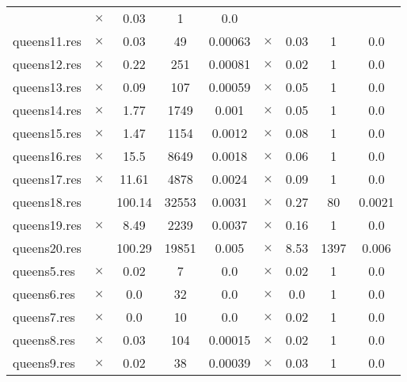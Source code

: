 \documentclass[main.tex]{subfiles}
\begin{document}
\begin{landscape}
\begin{center}
\begin{tabular}{|l|cccc|cccc|}
 & $\times$ & 0.03 & 1 & 0.0
\\
queens11.res & $\times$ & 0.03 & 49 & 0.00063
 & $\times$ & 0.03 & 1 & 0.0
\\
queens12.res & $\times$ & 0.22 & 251 & 0.00081
 & $\times$ & 0.02 & 1 & 0.0
\\
queens13.res & $\times$ & 0.09 & 107 & 0.00059
 & $\times$ & 0.05 & 1 & 0.0
\\
queens14.res & $\times$ & 1.77 & 1749 & 0.001
 & $\times$ & 0.05 & 1 & 0.0
\\
queens15.res & $\times$ & 1.47 & 1154 & 0.0012
 & $\times$ & 0.08 & 1 & 0.0
\\
queens16.res & $\times$ & 15.5 & 8649 & 0.0018
 & $\times$ & 0.06 & 1 & 0.0
\\
queens17.res & $\times$ & 11.61 & 4878 & 0.0024
 & $\times$ & 0.09 & 1 & 0.0
\\
queens18.res &  & 100.14 & 32553 & 0.0031
 & $\times$ & 0.27 & 80 & 0.0021
\\
queens19.res & $\times$ & 8.49 & 2239 & 0.0037
 & $\times$ & 0.16 & 1 & 0.0
\\
queens20.res &  & 100.29 & 19851 & 0.005
 & $\times$ & 8.53 & 1397 & 0.006
\\
queens5.res & $\times$ & 0.02 & 7 & 0.0
 & $\times$ & 0.02 & 1 & 0.0
\\
queens6.res & $\times$ & 0.0 & 32 & 0.0
 & $\times$ & 0.0 & 1 & 0.0
\\
queens7.res & $\times$ & 0.0 & 10 & 0.0
 & $\times$ & 0.02 & 1 & 0.0
\\
queens8.res & $\times$ & 0.03 & 104 & 0.00015
 & $\times$ & 0.02 & 1 & 0.0
\\
queens9.res & $\times$ & 0.02 & 38 & 0.00039
 & $\times$ & 0.03 & 1 & 0.0
\\
\hline\end{tabular}
\end{center}
\end{landscape}
\end{document}
